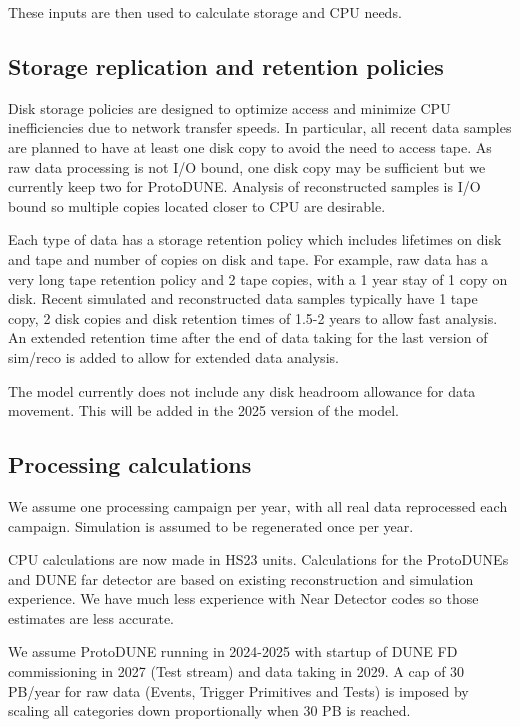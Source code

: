\documentclass[12pt]{article}
\begin{document}
     

  These inputs are then used to calculate storage and CPU needs. 

\subsection{Storage replication and retention policies}
Disk storage policies are designed to optimize access and minimize CPU inefficiencies due to network transfer speeds.  In particular, all recent data samples are planned to have at least one disk copy to avoid the need to access tape.  As raw data processing is not I/O bound, one disk copy may be sufficient but we currently keep two for ProtoDUNE. Analysis of reconstructed samples is I/O bound so multiple copies located closer to CPU are desirable. 

Each type of data has a storage retention policy which includes lifetimes on disk and tape and number of copies on disk and tape.  For example, raw data has a very long tape retention policy and 2 tape copies, with a 1 year stay of 1 copy on disk.   Recent simulated and reconstructed data samples typically have 1 tape copy, 2 disk copies and disk retention times of 1.5-2 years to allow fast analysis.   An extended retention time after the end of data taking for the last version of sim/reco is added to allow for extended data analysis. 

The model currently does not include any disk headroom allowance for data movement.  This will be added in the 2025 version of the model. 

\subsection{Processing calculations}

 We assume one processing campaign per year, with all real data reprocessed each campaign.   Simulation is assumed to be regenerated  once per year.
   
CPU calculations are now made in HS23 units.  Calculations for the ProtoDUNEs and DUNE far detector are based on existing reconstruction and simulation experience.  We have much less experience with Near Detector codes so those estimates are less accurate.

We assume ProtoDUNE running in 2024-2025 with startup of DUNE FD commissioning in 2027 (Test stream) and data taking in 2029. A cap of 30 PB/year for raw data (Events, Trigger Primitives and Tests) is imposed by scaling all categories down proportionally when 30 PB is reached. 
\end{document}
